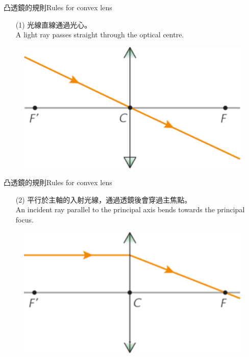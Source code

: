 \documentclass[beamer=true]{standalone}
\begin{document}
\begin{frame}{凸透鏡的規則Rules for convex lens}
    \begin{itemize}
        \item [(1)] 光線直線通過光心。\\A light ray passes straight through the optical centre.
    \end{itemize}\bigskip

    \begin{figure}
        \centering
        \includegraphics[width=0.5\linewidth]{assets/d112f2mage.png}


    \end{figure}
\end{frame}

\begin{frame}{凸透鏡的規則Rules for convex lens}
    \begin{itemize}
        \item [(2)] 平行於主軸的入射光線，通過透鏡後會穿過主焦點。\\An incident ray parallel to the principal axis bends towards the principal focus.
    \end{itemize}\bigskip
    \begin{figure}
        \centering
        \includegraphics[width=0.5\linewidth]{assets/89nud89u298d.png}


    \end{figure}
\end{frame}
\end{document}
